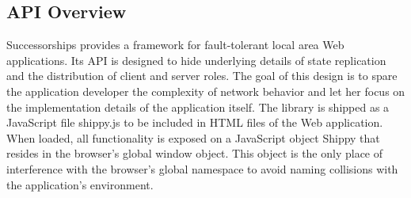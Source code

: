 \subsection{API Overview}
\label{sub:approach_api_overview}

Successorships provides a framework for fault-tolerant local area Web applications.
Its API is designed to hide underlying details of state replication and the distribution of client and server roles.
The goal of this design is to spare the application developer the complexity of network behavior and let her focus on the implementation details of the application itself.
The library is shipped as a JavaScript file {\ttfamily shippy.js} to be included in HTML files of the Web application.
When loaded, all functionality is exposed on a JavaScript object {\ttfamily Shippy} that resides in the browser's global {\ttfamily window} object.
This object is the only place of interference with the browser's global namespace to avoid naming collisions with the application's environment.